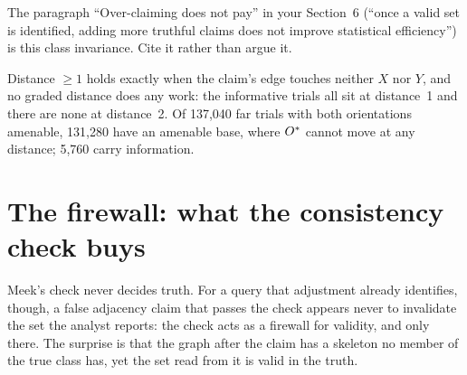 \begin{noprato}
The paragraph ``Over-claiming does not pay'' in your Section~6 (``once a valid set is identified,
adding more truthful claims does not improve statistical efficiency'') is this class invariance.
Cite it rather than argue it.
\end{noprato}


%
{Distance $\ge 1$ holds exactly when the claim's edge touches neither $X$ nor $Y$, and no graded
distance does any work: the informative trials all sit at distance~1 and there are none at
distance~2. Of 137,040 far trials with both orientations amenable, 131,280 have an amenable base,
where $O^{*}$ cannot move at any distance; 5,760 carry information.}

\begin{antes}
\end{antes}

\section{The firewall: what the consistency check buys}

\begin{ideia}
Meek's check never decides truth. For a query that adjustment already identifies, though, a false
adjacency claim that passes the check appears never to invalidate the set the analyst reports: the
check acts as a firewall for validity, and only there. The surprise is that the graph after the claim has a
skeleton no member of the true class has, yet the set read from it is valid in the truth.
\end{ideia}

